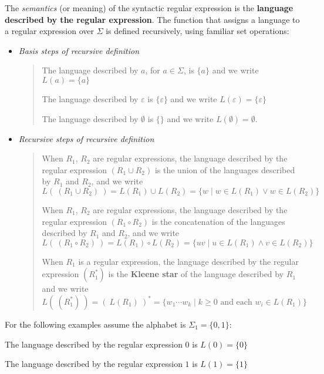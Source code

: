 \documentclass[12pt, oneside]{article}
\begin{document}
The {\it semantics} (or meaning) of the syntactic regular expression is the {\bf language
described by the regular expression}. The function that assigns a language to a regular expression
over $\Sigma$ is defined recursively, using familiar set operations:


\begin{itemize}
    \item[] {\it Basis steps of recursive definition}
    \begin{quote}    
        The language described by $a$, for $a \in \Sigma$, is $\{a\}$ and we write 
        $L(a) = \{a\}$
    
        The language described by $\varepsilon$ is $\{\varepsilon\}$ and we write 
        $L(\varepsilon) = \{ \varepsilon\}$
    
        The language described by $\emptyset$ is $\{\}$ and we write
        $L(\emptyset) = \emptyset$.
    \end{quote}
    
    \item[] {\it Recursive steps of recursive definition}
    \begin{quote}
        When $R_1$, $R_2$ are regular expressions, the language described by the regular
        expression $(R_1 \cup R_2)$ is the union of the languages described by $R_1$ and $R_2$, 
        and we write 
        $$L(~(R_1 \cup R_2)~) = L(R_1) \cup L(R_2) = \{ w \mid w \in L(R_1) \lor w \in L(R_2)\}$$
    
        When $R_1$, $R_2$ are regular expressions, the language described by the regular
        expression $(R_1 \circ R_2)$ is the concatenation of the languages described by $R_1$ and $R_2$, 
        and we write 
        $$L(~(R_1 \circ R_2)~) = L(R_1) \circ L(R_2) = \{ uv \mid u \in L(R_1) \land v \in L(R_2)\}$$
    
        When $R_1$ is a regular expression, the language described by the regular 
        expression $(R_1^*)$ is the {\bf Kleene star} of the language described by $R_1$ and we write
        $$L(~(R_1^*)~) = (~L(R_1)~)^* = \{ w_1 \cdots w_k \mid k \geq 0 \textrm{ and each } w_i \in L(R_1)\}$$
    \end{quote}
\end{itemize}
  
For the following examples assume the alphabet is $\Sigma_1 =  \{0,1\}$:
    
The language described by the regular expression $0$ is $L(0) = \{ 0 \}$

The language described by the regular expression $1$ is $L(1)  = \{ 1 \}$
\end{document}
